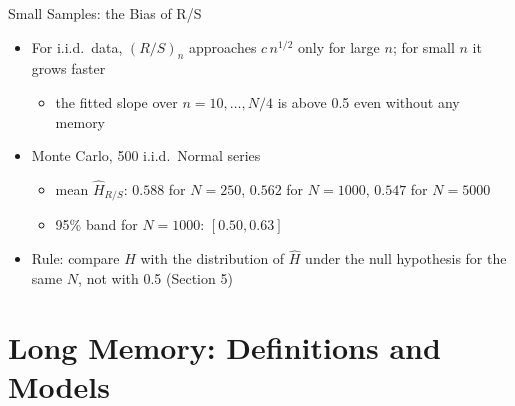 \begin{frame}{Small Samples: the Bias of R/S}
\itemsize{\small}
\begin{itemize}
    \item For i.i.d.\ data, $(R/S)_n$ approaches $c\,n^{1/2}$ only for large $n$; for small $n$ it grows faster 
    \begin{itemize}
        \item the fitted slope over $n = 10, \dots, N/4$ is above 0.5 even without any memory
    \end{itemize}
    \item Monte Carlo, 500 i.i.d.\ Normal series
    \begin{itemize}
        \item mean $\hat H_{R/S}$: $0.588$ for $N = 250$, $0.562$ for $N = 1000$, $0.547$ for $N = 5000$
        \item 95\% band for $N = 1000$: $[0.50, 0.63]$
    \end{itemize}
    \item Rule: compare $\hat H$ with the distribution of $\hat H$ under the null hypothesis for the same $N$, not with 0.5 (Section 5)
\end{itemize}
\end{frame}


\section{Long Memory: Definitions and Models}

